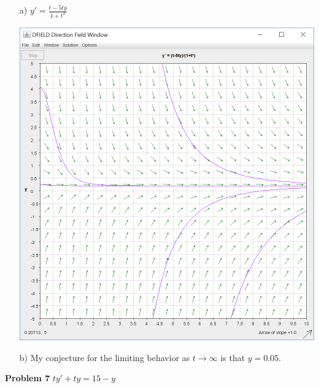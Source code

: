 \documentclass[10pt]{article}
\begin{document}
            \begin{enumerate}
                \item[a)] $y'=\frac{t-5ty}{1+t^2}$ \begin{center}\includegraphics[scale=0.5]{lab1p3p6.PNG}\end{center}
                \item[b)] My conjecture for the limiting behavior as $t \rightarrow \infty$ is that $y=0.05$.
            \end{enumerate}
        {\bf Problem 7} $ty'+ty=15-y$
\end{document}
